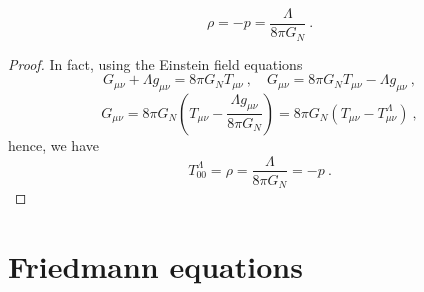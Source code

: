     \begin{equation*}
        \rho = - p = \frac{\Lambda}{8 \pi G_N} ~.
    \end{equation*}
    \begin{proof}
        In fact, using the Einstein field equations 
        \begin{equation*}
            G_{\mu\nu} + \Lambda g_{\mu\nu} = 8 \pi G_N T_{\mu\nu} ~, \quad G_{\mu\nu} = 8 \pi G_N T_{\mu\nu} - \Lambda g_{\mu\nu} ~,
        \end{equation*}
        \begin{equation*}
            G_{\mu\nu} = 8 \pi G_N ( T_{\mu\nu} - \frac{\Lambda g_{\mu\nu}}{8 \pi G_N} ) = 8 \pi G_N ( T_{\mu\nu} - T_{\mu\nu}^{\Lambda} ) ~,
        \end{equation*}
        hence, we have 
        \begin{equation*}
            T_{00}^{\Lambda} = \rho = \frac{\Lambda}{8 \pi G_N} = - p ~.
        \end{equation*}
    \end{proof}

\section{Friedmann equations}

